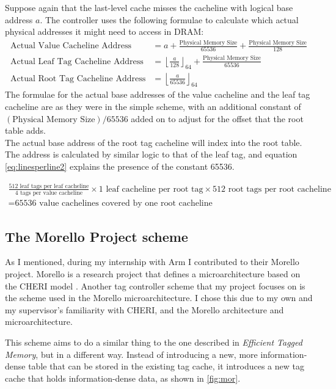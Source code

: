 Suppose again that the last-level cache misses the cacheline with logical base address $a$. The controller uses the following formulae to calculate which actual physical addresses it might need to access in DRAM:
\begin{align}
	\label{eq:avcae} \text{Actual Value Cacheline Address} &= a + \frac{\text{Physical Memory Size}}{65536} + \frac{\text{Physical Memory Size}}{128}\\
	\label{eq:altcae} \text{Actual Leaf Tag Cacheline Address} &= \left\lfloor \frac{a}{128} \right\rfloor_{64} + \frac{\text{Physical Memory Size}}{65536}\\
	\label{eq:artcae} \text{Actual Root Tag Cacheline Address} &= \left\lfloor \frac{a}{65536} \right\rfloor_{64}
\end{align}
The formulae for the actual base addresses of the value cacheline and the leaf tag cacheline are as they were in the simple scheme, with an additional constant of $(\text{Physical Memory Size})/65536$ added on to adjust for the offset that the root table adds.\\
The actual base address of the root tag cacheline will index into the root table. The address is calculated by similar logic to that of the leaf tag, and equation \ref{eq:linesperline2} explains the presence of the constant 65536.

\begin{multline} \label{eq:linesperline2}
\frac{\text{512 leaf tags per leaf cacheline}}{\text{4 tags per value cacheline}} \times \text{1 leaf cacheline per root tag} \times \text{512 root tags per root cacheline}\\
= \text{65536 value cachelines covered by one root cacheline}
\end{multline}

\subsection{The Morello Project scheme}
As I mentioned, during my internship with Arm I contributed to their Morello project. Morello is a research project that defines a microarchitecture based on the CHERI model \cite{morello}. Another tag controller scheme that my project focuses on is the scheme used in the Morello microarchitecture. I chose this due to my own and my supervisor's familiarity with CHERI, and the Morello architecture and microarchitecture.

This scheme aims to do a similar thing to the one described in \textit{Efficient Tagged Memory}, but in a different way. Instead of introducing a new, more information-dense table that can be stored in the existing tag cache, it introduces a new tag cache that holds information-dense data, as shown in \ref{fig:mor}.

